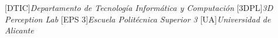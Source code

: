 [DTIC]{\emph{Departamento de Tecnología Informática y Computación}}
[3DPL]{\emph{3D Perception Lab}}
[EPS 3]{\emph{Escuela Politécnica Superior 3}}
[UA]{\emph{Universidad de Alicante}}
